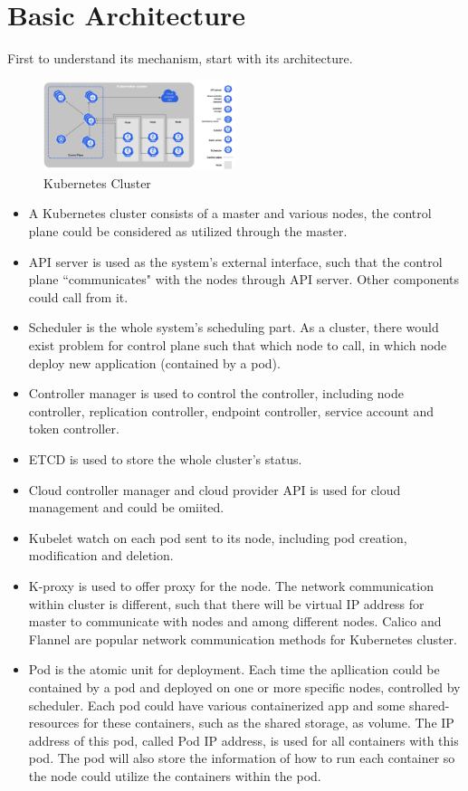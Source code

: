 \documentclass[conference, a4paper]{IEEEtran_ID}
\begin{document}
\section{Basic Architecture} 
First to understand its mechanism, start with its architecture\cite{43826}.
	\begin{figure}[htbp]
		\centerline{\includegraphics[width=0.5\textwidth]{kube.png}}
		\caption{Kubernetes Cluster\cite{kucom}}
		\label{dash}
	\end{figure}
\begin{itemize}
    \item A Kubernetes cluster consists of a master and various nodes, the control plane could be considered as utilized through the master.
    \item API server is used as the system's external interface, such that the control plane ``communicates" with the nodes through API server. Other components could call from it. 
    \item Scheduler is the whole system's scheduling part. As a cluster, there would exist problem for control plane such that which node to call, in which node deploy new application (contained by a pod).
    \item Controller manager is used to control the controller, including node controller, replication controller, endpoint controller, service account and token controller.
    \item ETCD is used to store the whole cluster's status. 
    \item Cloud controller manager and cloud provider API is used for cloud management and could be omiited. 
    \item Kubelet watch on each pod sent to its node, including pod creation, modification and deletion. 
    \item K-proxy is used to offer proxy for the node. The network communication within cluster is different, such that there will be virtual IP address for master to communicate with nodes and among different nodes. Calico and Flannel are popular network communication methods for Kubernetes cluster.  
    \item Pod is the atomic unit for deployment. Each time the apllication could be contained by a pod and deployed on one or more specific nodes, controlled by scheduler. Each pod could have various containerized app and some shared-resources for these containers, such as the shared storage, as volume. The IP address of this pod, called Pod IP address, is used for all containers with this pod. The pod will also store the information of how to run each container so the node could utilize the containers within the pod. 

\end{itemize}
\end{document}

